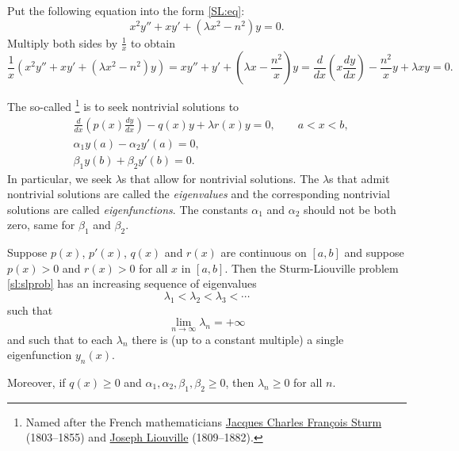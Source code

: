 \documentclass[12pt]{book}
\begin{document}
\begin{example}[Bessel]
Put the following equation into the form \eqref{SL:eq}:
\begin{equation*}
x^2 y'' + xy' + \left(\lambda x^2 - n^2\right)y = 0 .
\end{equation*}
Multiply both sides by $\frac{1}{x}$ to obtain
\begin{equation*}
\frac{1}{x} \left( x^2 y'' + xy' + \left(\lambda x^2 - n^2\right)y \right)
=
x y'' + y' + \left(\lambda x - \frac{n^2}{x}\right)y 
=
\frac{d}{dx} \left( x \frac{dy}{dx} \right)
- \frac{n^2}{x} y + \lambda x y  = 0.
\end{equation*}
\end{example}

The so-called 
\emph{}%
\footnote{Named after the French mathematicians
\href{http://en.wikipedia.org/wiki/Jacques_Charles_Fran\%C3\%A7ois_Sturm}{Jacques Charles Fran\c{c}ois Sturm}
(1803--1855) and
\href{http://en.wikipedia.org/wiki/Liouville}{Joseph Liouville}
(1809--1882).} is to seek
nontrivial solutions to
\begin{equation} \label{sl:slprob}
\boxed{~~
\begin{aligned}
&\frac{d}{dx} \left( p(x) \frac{dy}{dx} \right)
- q(x) y + \lambda r(x) y = 0, \qquad a < x < b, \\
&\alpha_1 y(a) - \alpha_2 y'(a) = 0, \\
&\beta_1 y(b) + \beta_2 y'(b) = 0.
\end{aligned}
~~}
\end{equation}
In particular, we seek $\lambda$s that allow for nontrivial solutions.
The $\lambda$s that admit nontrivial solutions
are called the \emph{eigenvalues}
and the corresponding
nontrivial solutions are called
\emph{eigenfunctions}.
The constants $\alpha_1$ and $\alpha_2$ should not be both zero, same for
$\beta_1$ and $\beta_2$.

\begin{theorem} \label{sl:slregthm}
Suppose $p(x)$, $p'(x)$, $q(x)$ and $r(x)$ are continuous on $[a,b]$
and suppose $p(x) > 0$ and $r(x) > 0$ for all $x$ in $[a,b]$.
Then the Sturm-Liouville problem \eqref{sl:slprob}
has an increasing sequence of eigenvalues
\begin{equation*}
\lambda_1 < \lambda_2 < \lambda_3 < \cdots 
\end{equation*}
such that
\begin{equation*}
\lim_{n \to \infty} \lambda_n = +\infty
\end{equation*}
and such that to each $\lambda_n$ there is (up to a constant multiple)
a single eigenfunction $y_n(x)$. 

Moreover, if $q(x) \geq 0$ and $\alpha_1, \alpha_2, \beta_1, \beta_2 \geq 0$,
then $\lambda_n \geq 0$ for all $n$.
\end{theorem}
\end{document}
